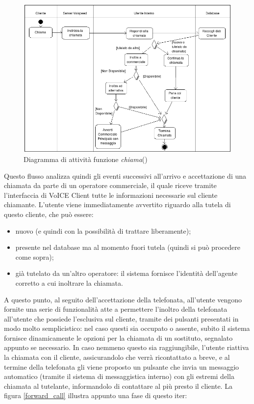 \begin{figure}[!ht]
\centering
  \includegraphics[scale=0.7]{./images/chiamataAct.png}
\caption{Diagramma di attivit\`a funzione \textit{chiama}()}
\label{act_call}
\end{figure}

\noindent
Questo flusso analizza quindi gli eventi successivi all'arrivo e accettazione di una chiamata da parte di un operatore commerciale, il quale riceve tramite l'interfaccia di VoICE Client tutte le informazioni necessarie sul cliente chiamante. L'utente viene immediatamente avvertito riguardo alla tutela di questo cliente, che pu\`o essere:
\begin{itemize}
 \item nuovo (e quindi con la possibilit\`a di trattare liberamente);
 \item presente nel database ma al momento fuori tutela (quindi si pu\`o procedere come sopra);
 \item gi\`a tutelato da un'altro operatore: il sistema fornisce l'identit\`a dell'agente corretto a cui inoltrare la chiamata.
\end{itemize}
\noindent
A questo punto, al seguito dell'accettazione della telefonata, all'utente vengono fornite una serie di funzionalit\`a atte a permettere l'inoltro della telefonata all'utente che possiede l'esclusiva sul cliente, tramite dei pulsanti presentati in modo molto semplicistico: nel caso questi sia occupato o assente, subito il sistema fornisce dinamicamente le opzioni per la chiamata di un sostituto, segnalato appunto se necessario. In caso nemmeno questo sia raggiungibile, l'utente riattiva la chiamata con il cliente, assicurandolo che verr\`a ricontattato a breve, e al termine della telefonata gli viene proposto un pulsante che invia un messaggio automatico (tramite il sistema di messaggistica interno) con gli estremi della chiamata al tutelante, informandolo di contattare al pi\`u presto il cliente. La figura \ref{forward_call} illustra appunto una fase di questo iter: 

